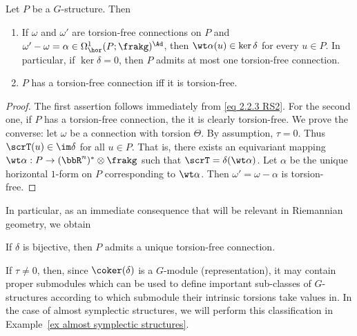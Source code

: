 \begin{prop}[{{\cite[Prop.~2.2.6]{RS2}}}]\label{prop 2.2.6 RS2}
    Let $P$ be a $G$-structure. Then
    \begin{enumerate}
        \item If $\omega$ and $\omega'$ are torsion-free connections on $P$ and $\omega'-\omega=\alpha\in\Omega^1_{\hor}(P;\frakg)^\Ad$, then $\wt\alpha(u)\in\ker\delta$ for every $u\in P$. In particular, if $\ker\delta=0$, then $P$ admits at most one torsion-free connection.
        \item $P$ has a torsion-free connection iff it is torsion-free.
    \end{enumerate}
\end{prop}
\begin{proof}
    The first assertion follows immediately from \eqref{eq 2.2.3 RS2}. For the second one, if $P$ has a torsion-free connection, the it is clearly torsion-free. We prove the converse: let $\omega$ be a connection with torsion $\Theta$. By assumption, $\tau=0$. Thus $\scrT(u)\in\im\delta$ for all $u\in P$. That is, there exists an equivariant mapping $\wt\alpha:P\to (\bbR^n)^\ast\otimes\frakg$ such that $\scrT=\delta(\wt\alpha)$. Let $\alpha$ be the unique horizontal $1$-form on $P$ corresponding to $\wt\alpha$. Then $\omega'=\omega-\alpha$ is torsion-free.
\end{proof}

In particular, as an immediate consequence that will be relevant in Riemannian geometry, we obtain 
\begin{cor}[{{\cite[Cor.~2.2.7]{RS2}}}]\label{cor 2.2.7 RS2}
    If $\delta$ is bijective, then $P$ admits a unique torsion-free connection.
\end{cor}

\begin{rem}
    If $\tau\neq 0$, then, since $\coker(\delta)$ is a $G$-module (representation), it may contain proper submodules which can be used to define important sub-classes of $G$-structures according to which submodule their intrinsic torsions take values in. In the case of almost symplectic structures, we will perform this classification in Example~\ref{ex almost symplectic structures}.
\end{rem}

